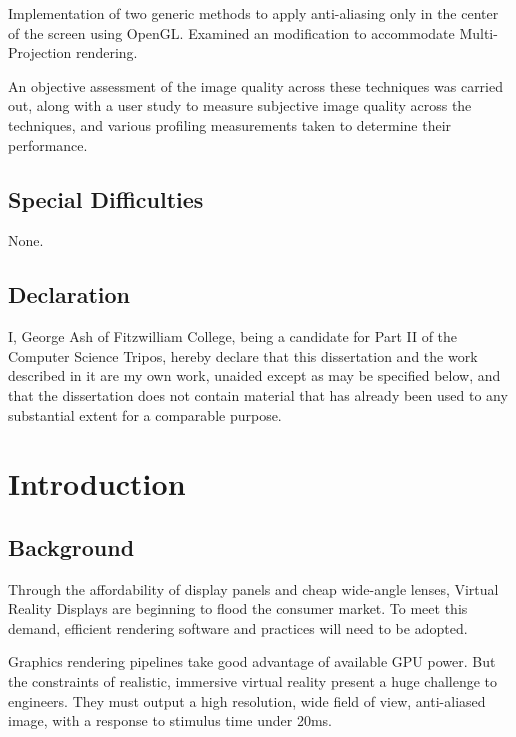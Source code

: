 \documentclass[12pt,a4paper,twoside,openright]{report}
\begin{document}
Implementation of two generic methods to apply anti-aliasing only in the center of the screen using OpenGL. Examined an modification to accommodate Multi-Projection rendering.

An objective assessment of the image quality across these techniques was carried out, along with a user study to measure subjective image quality across the techniques, and various profiling measurements taken to determine their performance.   

\section*{Special Difficulties}

None.
 
\newpage
\section*{Declaration}

I, George Ash of Fitzwilliam College, being a candidate for Part II of the Computer
Science Tripos, hereby declare
that this dissertation and the work described in it are my own work,
unaided except as may be specified below, and that the dissertation
does not contain material that has already been used to any substantial
extent for a comparable purpose.

\bigskip
{}

\medskip
{}

\tableofcontents

\listoffigures


\pagestyle{headings}

\chapter{Introduction}

\section{Background}

Through the affordability of display panels and cheap wide-angle lenses, Virtual Reality Displays are beginning to flood the consumer market. To meet this demand, efficient rendering software and practices will need to be adopted.

Graphics rendering pipelines take good advantage of available GPU power. But the constraints of realistic, immersive virtual reality present a huge challenge to engineers. They must output a high resolution, wide field of view, anti-aliased image, with a response to stimulus time under 20ms.
\end{document}
